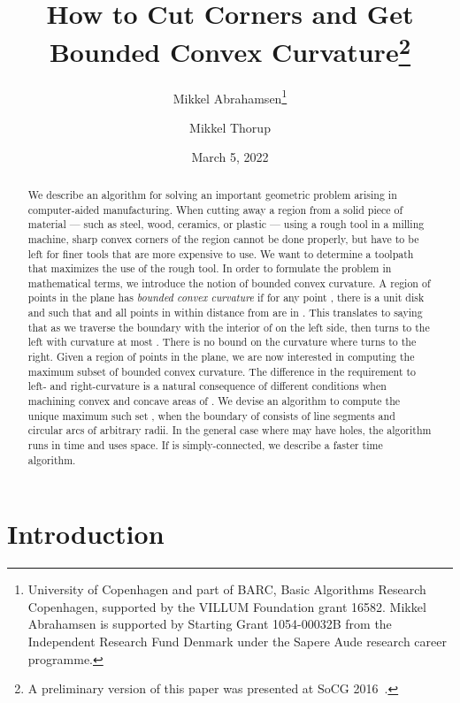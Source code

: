 \documentclass{article}
\begin{document}
\title{How to Cut Corners and Get Bounded Convex Curvature\footnote{A
preliminary version of this paper was presented at SoCG 2016~\cite{abrahamsen_et_al:LIPIcs:2016:5896}.}}

\author{Mikkel Abrahamsen\footnote{University of Copenhagen and part of BARC, Basic Algorithms Research Copenhagen, supported by the VILLUM Foundation grant 16582. Mikkel Abrahamsen is supported by Starting Grant 1054-00032B from the Independent Research Fund Denmark under the Sapere Aude research career programme.}
\and Mikkel Thorup\footnotemark[2]}

\date{March 5, 2022}

\maketitle

\begin{abstract}
We describe an algorithm for solving an important geometric problem arising in computer-aided manufacturing.
When cutting away a region from a solid piece of material --- such as steel, wood, ceramics, or plastic --- using a rough tool in a milling machine, sharp convex corners of the region cannot be done properly, but have to be left for finer tools that are more expensive to use.
We want to determine a toolpath that maximizes the use of the rough tool.
In order to formulate the problem in mathematical terms, we introduce the notion of bounded convex curvature.
A region of points in the plane  has \emph{bounded convex curvature} if for any point , there is a unit disk  and  such that  and all points in  within distance  from  are in .
This translates to saying that as we traverse the boundary  with the interior of  on the left side, then  turns to the left with curvature at most .
There is no bound on the curvature where  turns to the right.
Given a region of points  in the plane, we are now interested in computing the maximum subset  of bounded convex curvature.
The difference in the requirement to left- and right-curvature is a natural consequence of different conditions when machining convex and concave areas of .
We devise an algorithm to compute the unique maximum such set , when the boundary of  consists of  line segments and circular arcs of arbitrary radii.
In the general case where  may have holes, the algorithm runs in time  and uses  space.
If  is simply-connected, we describe a faster  time algorithm.
\end{abstract}


\section{Introduction}\label{introSec}
\end{document}
